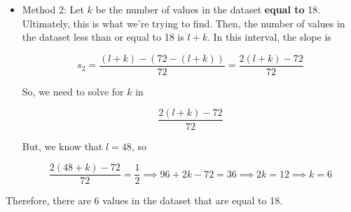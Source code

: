 \documentclass[11pt]{article}
\begin{document}
\begin{prob}[(16 pts)]
\begin{solution}
\begin{itemize}
\begin{itemize}
        \item Method 2: Let $k$ be the number of values in the dataset \textbf{equal to} 18. Ultimately, this is what we're trying to find. Then, the number of values in the dataset less than or equal to 18 is $l + k$. In this interval, the slope is
        
        $$s_2 = \frac{(l + k) - (72 - (l + k))}{72} = \frac{2(l + k) - 72}{72}$$

        So, we need to solve for $k$ in

        $$\frac{2(l + k) - 72}{72}$$

        But, we know that $l = 48$, so

        $$\frac{2(48 + k) - 72}{72} = \frac{1}{2} \implies 96 + 2k - 72 = 36 \implies 2k = 12 \implies \boxed{k = 6}$$
    \end{itemize}
\end{itemize}

Therefore, there are 6 values in the dataset that are equal to 18.
\end{solution}

\end{prob}

\newpage
\end{document}
